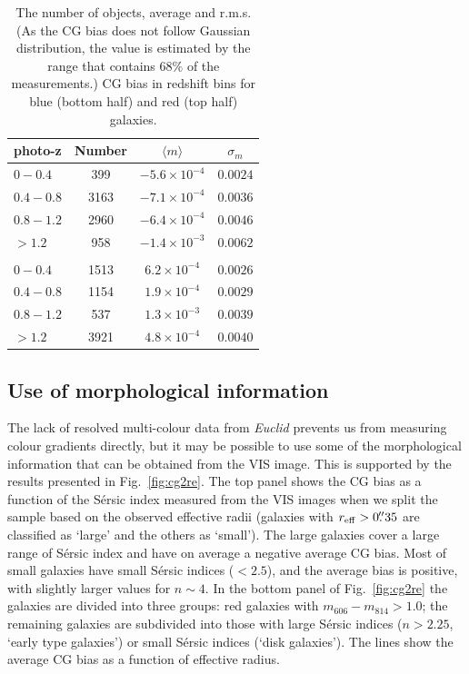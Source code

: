 \documentclass[useAMS,usenatbib]{mnras}
\begin{document}
\begin{table}
\begin{center}
  \begin{tabular}{lccc}
    \hline
    photo-z    &Number &$\langle m\rangle$  &$\sigma_m$ \\
    \hline
    $0-0.4$    &399  &$-5.6\times10^{-4}$  &$0.0024$\\
    $0.4-0.8$  &3163 &$-7.1\times10^{-4}$  &$0.0036$\\
    $0.8-1.2$  &2960 &$-6.4\times10^{-4}$  &$0.0046$\\
    $>1.2$     &958  &$-1.4\times10^{-3}$  &$0.0062$\\
    \\
    $0-0.4$  &1513  &$6.2\times10^{-4}$  &$0.0026$\\
    $0.4-0.8$ &1154  &$1.9\times10^{-4}$  &$0.0029$\\
    $0.8-1.2$ &537  &$1.3\times10^{-3}$  &$0.0039$\\
    $>1.2$  & 3921  &$4.8\times10^{-4}$  &$0.0040$\\
    \hline
  \end{tabular}
  \caption{The number of objects, average and r.m.s.(As the CG bias does not follow Gaussian distribution, the value is estimated by the range that contains $68 \% $ of the measurements.) CG bias in redshift bins for blue (bottom half) and red (top half) galaxies. }
  \label{table:calibration}
\end{center}
\end{table}

\subsection{Use of morphological information}

The lack of resolved multi-colour data from {\it Euclid} prevents us from
measuring colour gradients directly, but it may be possible to use some of the morphological
information that can be obtained from the VIS image. This is supported by the results
presented in Fig.~\ref{fig:cg2re}. The top panel shows the CG bias as a function of the
S{\'e}rsic index measured from the VIS images when we split the sample based on the
observed effective radii (galaxies with $r_{\rm eff}>0\hbox{$.\!\!^{\prime\prime}$} 35$ are classified as `large'
and the others as `small'). The large galaxies cover a large range of S{\'e}rsic index and have on average a negative average CG bias. Most of small galaxies have small S{\'e}rsic indices ($<2.5$), and
the average bias is positive, with slightly larger values for $n\sim 4$.
In the bottom panel of Fig.~\ref{fig:cg2re} the galaxies are divided into three groups: red galaxies
with $m_{606}-m_{814}>1.0$; the remaining galaxies are subdivided into those with
large S{\'e}rsic indices ($n>2.25$, `early type galaxies') or small S{\'e}rsic indices (`disk galaxies').
The lines show the average CG bias as a function of effective radius.
\end{document}
